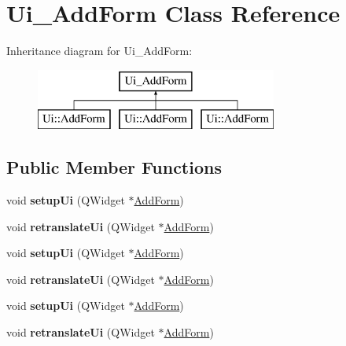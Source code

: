 \hypertarget{class_ui___add_form}{}\section{Ui\+\_\+\+Add\+Form Class Reference}
\label{class_ui___add_form}
Inheritance diagram for Ui\+\_\+\+Add\+Form\+:\begin{figure}[H]
\begin{center}
\leavevmode
\includegraphics[height=2.000000cm]{class_ui___add_form}
\end{center}
\end{figure}
\subsection*{Public Member Functions}
\begin{DoxyCompactItemize}
\item 
\mbox{\label{class_ui___add_form_af455ce00340387a301d9f86838f66ee4}} 
void {\bfseries setup\+Ui} (Q\+Widget $\ast$\hyperlink{class_add_form}{Add\+Form})
\item 
\mbox{\label{class_ui___add_form_a302a63c74c7a1d7270d1ed0c457e933a}} 
void {\bfseries retranslate\+Ui} (Q\+Widget $\ast$\hyperlink{class_add_form}{Add\+Form})
\item 
\mbox{\label{class_ui___add_form_af455ce00340387a301d9f86838f66ee4}} 
void {\bfseries setup\+Ui} (Q\+Widget $\ast$\hyperlink{class_add_form}{Add\+Form})
\item 
\mbox{\label{class_ui___add_form_a302a63c74c7a1d7270d1ed0c457e933a}} 
void {\bfseries retranslate\+Ui} (Q\+Widget $\ast$\hyperlink{class_add_form}{Add\+Form})
\item 
\mbox{\label{class_ui___add_form_af455ce00340387a301d9f86838f66ee4}} 
void {\bfseries setup\+Ui} (Q\+Widget $\ast$\hyperlink{class_add_form}{Add\+Form})
\item 
\mbox{\label{class_ui___add_form_a302a63c74c7a1d7270d1ed0c457e933a}} 
void {\bfseries retranslate\+Ui} (Q\+Widget $\ast$\hyperlink{class_add_form}{Add\+Form})
\end{DoxyCompactItemize}
